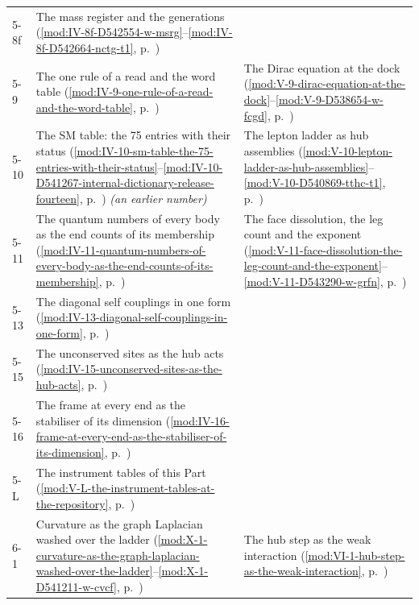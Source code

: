 {\begin{longtable}{p{11mm}p{70mm}p{60mm}}
5-8f & The mass register and the generations (\ref{mod:IV-8f-D542554-w-msrg}--\ref{mod:IV-8f-D542664-nctg-t1}, p.~\pageref{mod:IV-8f-D542554-w-msrg}) &  \\
5-9 & The one rule of a read and the word table (\ref{mod:IV-9-one-rule-of-a-read-and-the-word-table}, p.~\pageref{mod:IV-9-one-rule-of-a-read-and-the-word-table}) & The Dirac equation at the dock (\ref{mod:V-9-dirac-equation-at-the-dock}--\ref{mod:V-9-D538654-w-fcgd}, p.~\pageref{mod:V-9-dirac-equation-at-the-dock}) \\
5-10 & The SM table: the 75 entries with their status (\ref{mod:IV-10-sm-table-the-75-entries-with-their-status}--\ref{mod:IV-10-D541267-internal-dictionary-release-fourteen}, p.~\pageref{mod:IV-10-sm-table-the-75-entries-with-their-status}) \emph{(an earlier number)} & The lepton ladder as hub assemblies (\ref{mod:V-10-lepton-ladder-as-hub-assemblies}--\ref{mod:V-10-D540869-tthc-t1}, p.~\pageref{mod:V-10-lepton-ladder-as-hub-assemblies}) \\
5-11 & The quantum numbers of every body as the end counts of its membership (\ref{mod:IV-11-quantum-numbers-of-every-body-as-the-end-counts-of-its-membership}, p.~\pageref{mod:IV-11-quantum-numbers-of-every-body-as-the-end-counts-of-its-membership}) & The face dissolution, the leg count and the exponent (\ref{mod:V-11-face-dissolution-the-leg-count-and-the-exponent}--\ref{mod:V-11-D543290-w-grfn}, p.~\pageref{mod:V-11-face-dissolution-the-leg-count-and-the-exponent}) \\
5-13 & The diagonal self couplings in one form (\ref{mod:IV-13-diagonal-self-couplings-in-one-form}, p.~\pageref{mod:IV-13-diagonal-self-couplings-in-one-form}) &  \\
5-15 & The unconserved sites as the hub acts (\ref{mod:IV-15-unconserved-sites-as-the-hub-acts}, p.~\pageref{mod:IV-15-unconserved-sites-as-the-hub-acts}) &  \\
5-16 & The frame at every end as the stabiliser of its dimension (\ref{mod:IV-16-frame-at-every-end-as-the-stabiliser-of-its-dimension}, p.~\pageref{mod:IV-16-frame-at-every-end-as-the-stabiliser-of-its-dimension}) &  \\
5-L & The instrument tables of this Part (\ref{mod:V-L-the-instrument-tables-at-the-repository}, p.~\pageref{mod:V-L-the-instrument-tables-at-the-repository}) &  \\
6-1 & Curvature as the graph Laplacian washed over the ladder (\ref{mod:X-1-curvature-as-the-graph-laplacian-washed-over-the-ladder}--\ref{mod:X-1-D541211-w-cvcf}, p.~\pageref{mod:X-1-curvature-as-the-graph-laplacian-washed-over-the-ladder}) & The hub step as the weak interaction (\ref{mod:VI-1-hub-step-as-the-weak-interaction}, p.~\pageref{mod:VI-1-hub-step-as-the-weak-interaction}) \\

\end{longtable}}

